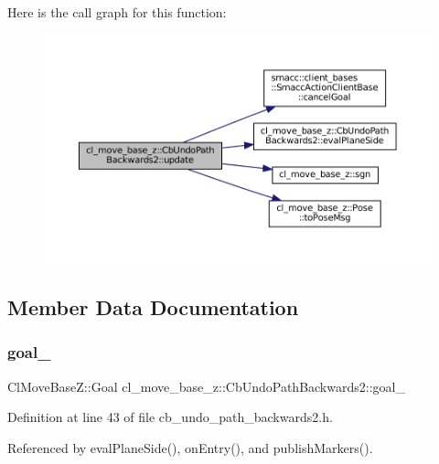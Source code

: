 Here is the call graph for this function\+:
\nopagebreak
\begin{figure}[H]
\begin{center}
\leavevmode
\includegraphics[width=350pt]{classcl__move__base__z_1_1CbUndoPathBackwards2_a62f0d53fc341ca6d241637cc0e4b2e30_cgraph}
\end{center}
\end{figure}


\subsection{Member Data Documentation}
\mbox{\label{classcl__move__base__z_1_1CbUndoPathBackwards2_ad119c38ee9cb341c9b468682d1794538}} 
\subsubsection{\texorpdfstring{goal\+\_\+}{goal\_}}
{\footnotesize\ttfamily Cl\+Move\+Base\+Z\+::\+Goal cl\+\_\+move\+\_\+base\+\_\+z\+::\+Cb\+Undo\+Path\+Backwards2\+::goal\+\_\+\hspace{0.3cm}{\ttfamily [private]}}



Definition at line 43 of file cb\+\_\+undo\+\_\+path\+\_\+backwards2.\+h.



Referenced by eval\+Plane\+Side(), on\+Entry(), and publish\+Markers().

